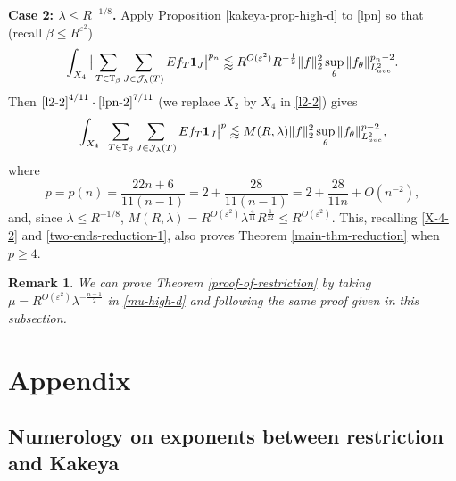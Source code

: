 \documentclass{amsart}
\numberwithin{equation}{section}
\newtheorem{remark}[theorem]{Remark}
\newcommand{\be}{\beta}
\newcommand{\e}{\varepsilon}
\newcommand{\la}{\lambda}
\newcommand{\cj}{\mathcal J}
\newcommand{\ZT}{\mathbb{T}}
\newcommand{\Id}{{\bf 1}}
\begin{document}
\smallskip

{\bf Case 2: $\la\leq R^{-1/8}$.}
Apply Proposition \ref{kakeya-prop-high-d} to \eqref{lpn} so that (recall $\be\leq R^{\e^2}$)
\begin{align}
\label{lpn-2}
    \int_{X_4}\big|\sum_{T\in\ZT_\be}\sum_{J\in\cj_\la(T)}Ef_{T}\Id_J\big|^{p_n}\lessapprox R^{O(\e^2)}R^{-\frac{1}{2}}\|f\|_2^2\sup_\theta\|f_\theta\|_{L^2_{ave}}^{p_n-2}.
\end{align}
Then $\eqref{l2-2}^{4/11}\cdot\eqref{lpn-2}^{7/11}$ (we replace $X_2$ by $X_4$ in \eqref{l2-2}) gives
\begin{equation}
    \int_{X_4}\big|\sum_{T\in\ZT_\be}\sum_{J\in\cj_\la(T)}Ef_{T}\Id_J\big|^{p}\lessapprox M(R,\la)\|f\|_2^2\sup_\theta\|f_\theta\|_{L^2_{ave}}^{p-2},
\end{equation}
where 
\begin{equation}
    p=p(n)=\frac{22n+6}{11(n-1)}=2+\frac{28}{11(n-1)}=2+\frac{28}{11n}+O(n^{-2}),
 \end{equation}
and, since $\la\leq     R^{-1/8}$, $M(R,\la)= R^{O(\e^2)}\la^{\frac{4}{11}}R^{\frac{1}{22}}\leq R^{O(\e^2)}$.
This, recalling \eqref{X-4-2} and \eqref{two-ends-reduction-1}, also proves Theorem \ref{main-thm-reduction} when $p\geq4$.

\begin{remark}
\rm

We can prove Theorem \ref{proof-of-restriction} by taking $\mu=R^{O(\e^2)}\la^{-\frac{n-1}{2}}$ in \eqref{mu-high-d} and following the same proof given in this subsection.

\end{remark}


\bigskip



\section{Appendix}
\label{ending-remark}

\subsection{Numerology on exponents between restriction and Kakeya}
\end{document}
